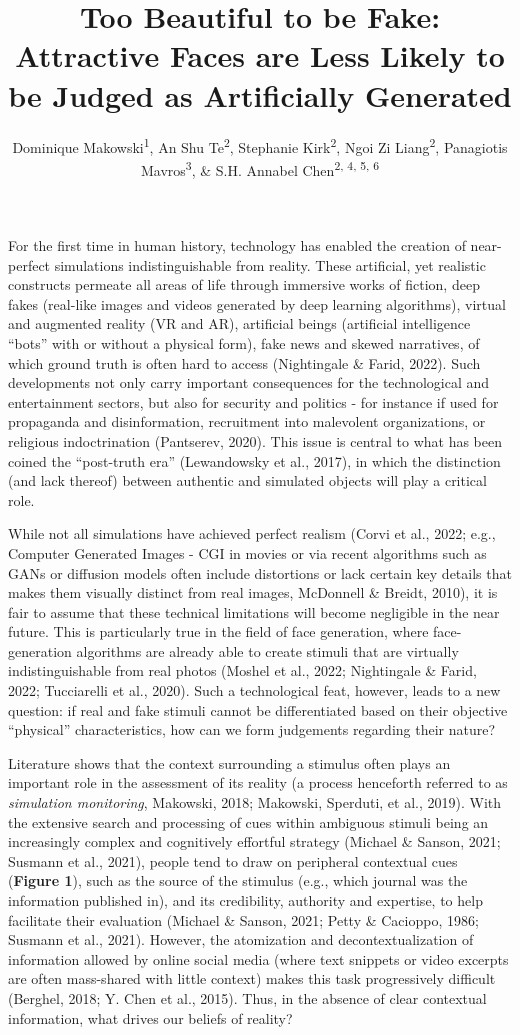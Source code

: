 \documentclass[
  man,floatsintext]{apa6}
\title{\textbf{Too Beautiful to be Fake: Attractive Faces are Less Likely to be Judged as Artificially Generated}}
\author{Dominique Makowski\textsuperscript{1}, An Shu Te\textsuperscript{2}, Stephanie Kirk\textsuperscript{2}, Ngoi Zi Liang\textsuperscript{2}, Panagiotis Mavros\textsuperscript{3}, \& S.H. Annabel Chen\textsuperscript{2, 4, 5, 6}}
\date{}
\affiliation{\vspace{0.5cm}\textsuperscript{1} School of Psychology, University of Sussex, UK\\\textsuperscript{2} School of Social Sciences, Nanyang Technological University, Singapore\\\textsuperscript{3} Department of Economics and Social Sciences, Télécom Paris, France\\\textsuperscript{4} LKC Medicine, Nanyang Technological University, Singapore\\\textsuperscript{5} National Institute of Education, Singapore\\\textsuperscript{6} Centre for Research and Development in Learning, Nanyang Technological University, Singapore}
\begin{document}
\maketitle

For the first time in human history, technology has enabled the creation of near-perfect simulations indistinguishable from reality. These artificial, yet realistic constructs permeate all areas of life through immersive works of fiction, deep fakes (real-like images and videos generated by deep learning algorithms), virtual and augmented reality (VR and AR), artificial beings (artificial intelligence ``bots'' with or without a physical form), fake news and skewed narratives, of which ground truth is often hard to access (Nightingale \& Farid, 2022). Such developments not only carry important consequences for the technological and entertainment sectors, but also for security and politics - for instance if used for propaganda and disinformation, recruitment into malevolent organizations, or religious indoctrination (Pantserev, 2020). This issue is central to what has been coined the ``post-truth era'' (Lewandowsky et al., 2017), in which the distinction (and lack thereof) between authentic and simulated objects will play a critical role.

While not all simulations have achieved perfect realism (Corvi et al., 2022; e.g., Computer Generated Images - CGI in movies or via recent algorithms such as GANs or diffusion models often include distortions or lack certain key details that makes them visually distinct from real images, McDonnell \& Breidt, 2010), it is fair to assume that these technical limitations will become negligible in the near future. This is particularly true in the field of face generation, where face-generation algorithms are already able to create stimuli that are virtually indistinguishable from real photos (Moshel et al., 2022; Nightingale \& Farid, 2022; Tucciarelli et al., 2020). Such a technological feat, however, leads to a new question: if real and fake stimuli cannot be differentiated based on their objective ``physical'' characteristics, how can we form judgements regarding their nature?

Literature shows that the context surrounding a stimulus often plays an important role in the assessment of its reality (a process henceforth referred to as \emph{simulation monitoring}, Makowski, 2018; Makowski, Sperduti, et al., 2019). With the extensive search and processing of cues within ambiguous stimuli being an increasingly complex and cognitively effortful strategy (Michael \& Sanson, 2021; Susmann et al., 2021), people tend to draw on peripheral contextual cues (\textbf{Figure 1}), such as the source of the stimulus (e.g., which journal was the information published in), and its credibility, authority and expertise, to help facilitate their evaluation (Michael \& Sanson, 2021; Petty \& Cacioppo, 1986; Susmann et al., 2021). However, the atomization and decontextualization of information allowed by online social media (where text snippets or video excerpts are often mass-shared with little context) makes this task progressively difficult (Berghel, 2018; Y. Chen et al., 2015). Thus, in the absence of clear contextual information, what drives our beliefs of reality?
\end{document}
